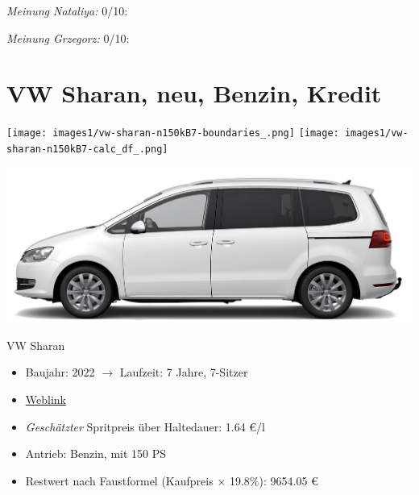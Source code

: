 \documentclass[landscape, DIV=99, 14pt]{scrartcl}
\begin{document}
\begin{small}
\emph{Meinung Nataliya:} 0/10: 
        
\emph{Meinung Grzegorz:} 0/10: 
\end{small}

\pagebreak


\twocolumn

\section*{VW Sharan, neu, Benzin, Kredit}
\begin{center}
\texttt{[image: images1/vw-sharan-n150kB7-boundaries\_.png]}
\null
\vspace{0.5cm}
\texttt{[image: images1/vw-sharan-n150kB7-calc\_df\_.png]}
\end{center}

\pagebreak
\begin{center}
\includegraphics[width=0.9\columnwidth]{cars/vw-sharan.png}

VW Sharan
\end{center}

\begin{itemize}
    \item Baujahr: 2022 $\rightarrow$ Laufzeit: 7 Jahre, 7-Sitzer
    \item \href{https://www.volkswagen.de/de/konfigurator.html/__app/sharan/sharan/highline.app?buildabilityStatus-app=buildable&category-app=private&carlineId-app=31605&salesGroupId-app=32850&trimName-app=Highline&modelId-app=7N24GY%24GYOIYOI%24GYOUYOU&modelVersion-app=0&modelYear-app=2022&exteriorId-app=F14+0Q0Q&interiorId-app=F56+++++BY&options-app=GPF2PF2-GWBEWBE-GWG1WG1-GWH3WH3-GYOWYOW-MAHV1M6-MKSUKA2-MSSH4KF}{Weblink}
    \item \emph{Gesch\"atzter} Spritpreis \"uber Haltedauer: 1.64 \euro{}/l
    \item Antrieb: Benzin, mit 150 PS
    \item Restwert nach Faustformel (Kaufpreis $\times$ 19.8\%): 9654.05 \euro{}
\end{itemize}
\end{document}
